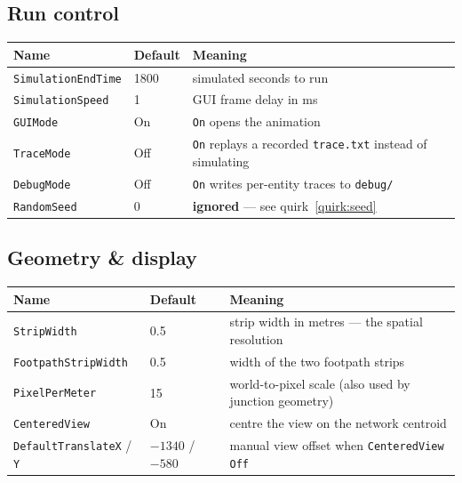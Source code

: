\documentclass[11pt, a4paper]{article}
\newcommand{\code}[1]{\texttt{#1}}
\begin{document}
\subsection{Run control}
\begin{tabularx}{\textwidth}{l l X}
\toprule
\textbf{Name} & \textbf{Default} & \textbf{Meaning} \\
\midrule
\code{SimulationEndTime} & 1800 & simulated seconds to run \\
\code{SimulationSpeed} & 1 & GUI frame delay in ms \\
\code{GUIMode} & On & \code{On} opens the animation \\
\code{TraceMode} & Off & \code{On} replays a recorded \code{trace.txt} instead of simulating \\
\code{DebugMode} & Off & \code{On} writes per-entity traces to \code{debug/} \\
\code{RandomSeed} & 0 & \textbf{ignored} --- see quirk~\ref{quirk:seed} \\
\bottomrule
\end{tabularx}

\subsection{Geometry \& display}
\begin{tabularx}{\textwidth}{l l X}
\toprule
\textbf{Name} & \textbf{Default} & \textbf{Meaning} \\
\midrule
\code{StripWidth} & 0.5 & strip width in metres --- the spatial resolution \\
\code{FootpathStripWidth} & 0.5 & width of the two footpath strips \\
\code{PixelPerMeter} & 15 & world-to-pixel scale (also used by junction geometry) \\
\code{CenteredView} & On & centre the view on the network centroid \\
\code{DefaultTranslateX} / \code{Y} & $-1340$ / $-580$ & manual view offset when \code{CenteredView Off} \\
\bottomrule
\end{tabularx}
\end{document}
